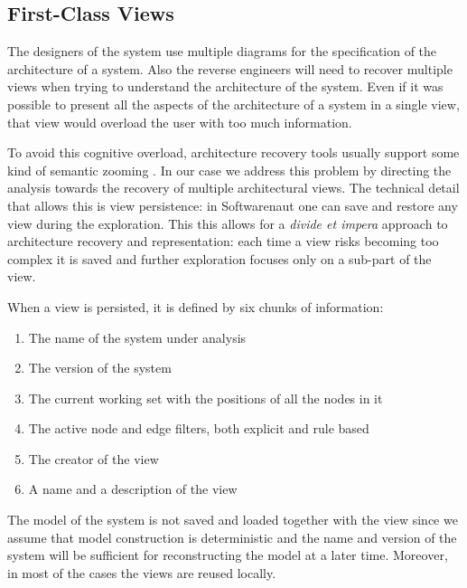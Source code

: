\documentclass[preprint,12pt]{elsarticle}
\begin{document}
\newpage
\subsection {First-Class Views}

The designers of the system use multiple diagrams for the specification of the architecture of a system. Also the reverse engineers will need to recover multiple views when trying to understand the architecture of the system. Even if it was possible to present all the aspects of the architecture of a system in a single view, that view would overload the user with too much information.

To avoid this cognitive overload, architecture recovery tools usually support some kind of semantic zooming \cite{storey-shrimp}. In our case we address this problem by directing the analysis towards the recovery of multiple architectural views. The technical detail that allows this is view persistence: in Softwarenaut one can save and restore any view during the exploration. This this allows for a {\em divide et impera} approach to architecture recovery and representation: each time a view risks becoming too complex it is saved and further exploration focuses only on a sub-part of the view. 

When a view is persisted, it is defined by six chunks of information:

\begin{enumerate}
\item The name of the system under analysis
\item The version of the system 
\item The current working set with the positions of all the nodes in it
\item The active node and edge filters, both explicit and rule based
\item The creator of the view
\item A name and a description of the view
\end{enumerate}

The model of the system is not saved and loaded together with the view since we assume that model construction is deterministic and the name and version of the system will be sufficient for reconstructing the model at a later time. Moreover, in most of the cases the views are reused locally.


\end{document}
